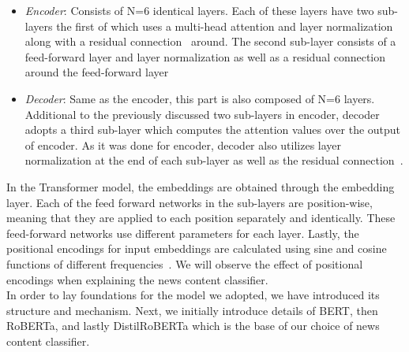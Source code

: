 \begin{itemize}
    \item \emph{Encoder}: Consists of N=6 identical layers. Each of these layers have two sub-layers the first of which uses a multi-head attention and layer normalization~\parencite{LayerNorm_Ba} along with a residual connection~\parencite{ResidualConnection_He} around. The second sub-layer consists of a feed-forward layer and layer normalization as well as a residual connection around the feed-forward layer~\parencite{AttentionIsAllYouNeed_Vaswani}
    \item \emph{Decoder}: Same as the encoder, this part is also composed of N=6 layers. Additional to the previously discussed two sub-layers in encoder, decoder adopts a third sub-layer which computes the attention values over the output of encoder. As it was done for encoder, decoder also utilizes layer normalization at the end of each sub-layer as well as the residual connection~\parencite{AttentionIsAllYouNeed_Vaswani}.
\end{itemize}
In the Transformer model, the embeddings are obtained through the embedding layer. Each of the feed forward networks in the sub-layers are position-wise, meaning that they are applied to each position separately and identically. These feed-forward networks use different parameters for each layer. Lastly, the positional encodings for input embeddings are calculated using sine and cosine functions of different frequencies~\parencite{AttentionIsAllYouNeed_Vaswani}. We will observe the effect of positional encodings when explaining the news content classifier.\\
In order to lay foundations for the model we adopted, we have introduced its structure and mechanism. Next, we initially introduce details of BERT, then RoBERTa, and lastly DistilRoBERTa which is the base of our choice of news content classifier.

